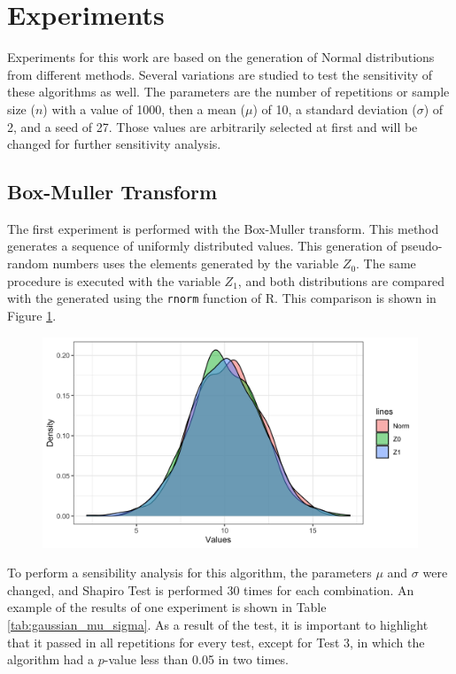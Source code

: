 \documentclass[10pt,leter,openany]{article}
\begin{document}
\section{Experiments}
	
	Experiments for this work are based on the generation of Normal distributions from different methods. Several variations are studied to test the sensitivity of these algorithms as well. The parameters are the number of repetitions or sample size ($ n $) with a value of 1000, then a mean ($\mu$) of 10, a standard deviation ($\sigma$) of 2, and a seed of 27. Those values are arbitrarily selected at first and will be changed for further sensitivity analysis. 
	
	\subsection{Box-Muller Transform}
	
		The first experiment is performed with the Box-Muller transform. This method generates a sequence of uniformly distributed values. This generation of pseudo-random numbers uses the elements generated by the variable $Z_{0}$. The same procedure is executed with the variable $Z_{1}$, and both distributions are compared with the generated using the \texttt{rnorm} function of R. This comparison is shown in Figure \ref{fig:dens1}.
	
			\begin{figure}
				\begin{center}
					\includegraphics[scale=0.29]{extras/densplot1}
					\label{fig:dens1}
				\end{center}
			\end{figure}
		
		
		To perform a sensibility analysis for this algorithm, the parameters $\mu$ and $\sigma$ were changed, and Shapiro Test is performed 30 times for each combination. An example of the results of one experiment is shown in Table \ref{tab:gaussian_mu_sigma}. As a result of the test, it is important to highlight that it passed in all repetitions for every test, except for Test 3, in which the algorithm had a $p$-value less than 0.05 in two times.
		
\end{document}
